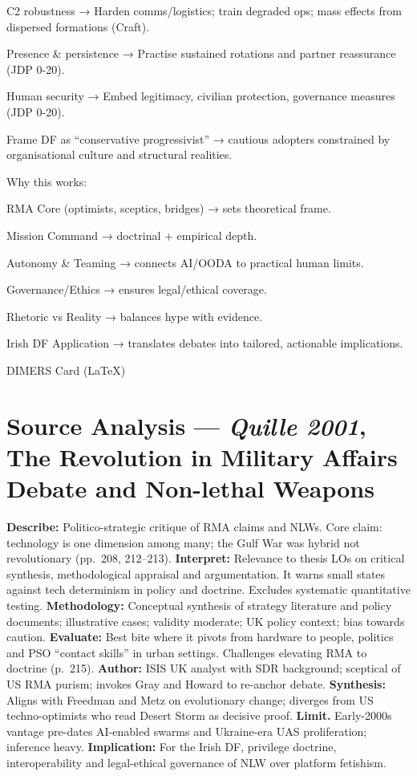 C2 robustness → Harden comms/logistics; train degraded ops; mass effects from dispersed formations (Craft).

Presence \& persistence → Practise sustained rotations and partner reassurance (JDP 0-20).

Human security → Embed legitimacy, civilian protection, governance measures (JDP 0-20).

Frame DF as “conservative progressivist” → cautious adopters constrained by organisational culture and structural realities.

 Why this works:

RMA Core (optimists, sceptics, bridges) → sets theoretical frame.

Mission Command → doctrinal + empirical depth.

Autonomy \& Teaming → connects AI/OODA to practical human limits.

Governance/Ethics → ensures legal/ethical coverage.

Rhetoric vs Reality → balances hype with evidence.

Irish DF Application → translates debates into tailored, actionable implications.

\parencite{QUILLE_2001}

DIMERS Card (LaTeX)

\section*{Source Analysis — \textit{Quille 2001}, The Revolution in Military Affairs Debate and Non-lethal Weapons}
\textbf{Describe:} Politico-strategic critique of RMA claims and NLWs. Core claim: technology is one dimension among many; the Gulf War was hybrid not revolutionary (pp.~208, 212–213).
\textbf{Interpret:} Relevance to thesis LOs on critical synthesis, methodological appraisal and argumentation. It warns small states against tech determinism in policy and doctrine. Excludes systematic quantitative testing.
\textbf{Methodology:} Conceptual synthesis of strategy literature and policy documents; illustrative cases; validity moderate; UK policy context; bias towards caution.
\textbf{Evaluate:} Best bite where it pivots from hardware to people, politics and PSO “contact skills” in urban settings. Challenges elevating RMA to doctrine (p.~215).
\textbf{Author:} ISIS UK analyst with SDR background; sceptical of US RMA purism; invokes Gray and Howard to re-anchor debate.
\textbf{Synthesis:} Aligns with Freedman and Metz on evolutionary change; diverges from US techno-optimists who read Desert Storm as decisive proof.
\textbf{Limit.} Early-2000s vantage pre-dates AI-enabled swarms and Ukraine-era UAS proliferation; inference heavy.
\textbf{Implication:} For the Irish DF, privilege doctrine, interoperability and legal-ethical governance of NLW over platform fetishism.

